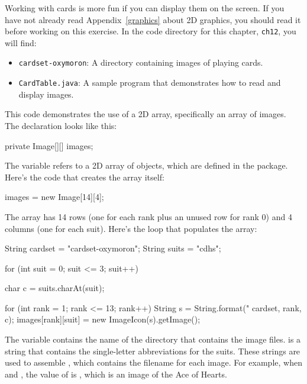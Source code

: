 \begin{exercise}  %


Working with cards is more fun if you can display them on the screen.
If you have not already read Appendix~\ref{graphics} about 2D graphics, you should read it before working on this exercise.
In the code directory for this chapter, {\tt ch12}, you will find:

\begin{itemize}

\item {\tt cardset-oxymoron}: A directory containing images of playing cards.

\item {\tt CardTable.java}: A sample program that demonstrates how to read and display images.

\end{itemize}


This code demonstrates the use of a 2D array, specifically an array of images.
The declaration looks like this:

\begin{code}
private Image[][] images;
\end{code}

The variable  refers to a 2D array of  objects, which are defined in the  package.
Here's the code that creates the array itself:

\begin{code}
images = new Image[14][4];
\end{code}

The array has 14 rows (one for each rank plus an unused row for rank 0) and 4 columns (one for each suit).
Here's the loop that populates the array:

\begin{code}
String cardset = "cardset-oxymoron";
String suits = "cdhs";

for (int suit = 0; suit <= 3; suit++) {
    char c = suits.charAt(suit);

    for (int rank = 1; rank <= 13; rank++) {
        String s = String.format("%
                                 cardset, rank, c);
        images[rank][suit] = new ImageIcon(s).getImage();
    }
}
\end{code}

The variable  contains the name of the directory that contains the image files.
 is a string that contains the single-letter abbreviations for the suits.
These strings are used to assemble , which contains the filename for each image.
For example, when  and , the value of  is , which is an image of the Ace of Hearts.


\end{exercise}
